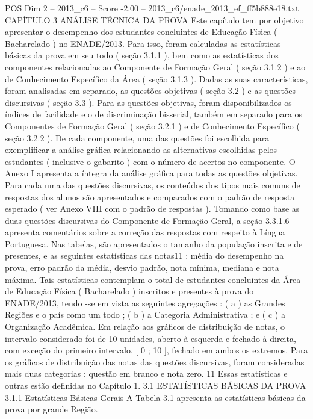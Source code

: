 \begin{textsample}{POS Dim 2 – 2013\_c6 – Score -2.00 – 2013\_c6/enade\_2013\_ef\_ff5b888e18.txt}  \label{ex:f2_pos_380}
CAPÍTULO 3 ANÁLISE TÉCNICA DA PROVA Este capítulo tem por objetivo apresentar o desempenho dos estudantes concluintes de Educação Física ( Bacharelado ) no ENADE/2013.
Para isso, foram calculadas as estatísticas básicas da prova em seu todo ( seção 3.1.1 ), bem como as estatísticas dos componentes relacionadas ao Componente de Formação Geral ( seção 3.1.2 ) e ao de Conhecimento Específico da Área ( seção 3.1.3 ).
Dadas as suas características, foram analisadas em separado, as questões objetivas ( seção 3.2 ) e as questões discursivas ( seção 3.3 ).
Para as questões objetivas, foram disponibilizados os índices de facilidade e o de discriminação bisserial, também em separado para os Componentes de Formação Geral ( seção 3.2.1 ) e de Conhecimento Específico ( seção 3.2.2 ).
De cada componente, uma das questões foi escolhida para exemplificar a análise gráfica relacionando as alternativas escolhidas pelos estudantes ( inclusive o gabarito ) com o número de acertos no componente.
O Anexo I apresenta a íntegra da análise gráfica para todas as questões objetivas.
Para cada uma das questões discursivas, os conteúdos dos tipos mais comuns de respostas dos alunos são apresentados e comparados com o padrão de resposta esperado ( ver Anexo VIII com o padrão de respostas ).
Tomando como base as duas questões discursivas do Componente de Formação Geral, a seção 3.3.1.6 apresenta comentários sobre a correção das respostas com respeito à Língua Portuguesa.
Nas tabelas, são apresentados o tamanho da população inscrita e de presentes, e as seguintes estatísticas das notas11 : média do desempenho na prova, erro padrão da média, desvio padrão, nota mínima, mediana e nota máxima.
Tais estatísticas contemplam o total de estudantes concluintes da Área de Educação Física ( Bacharelado ) inscritos e presentes à prova do ENADE/2013, tendo -se em vista as seguintes agregações : ( a ) as Grandes Regiões e o país como um todo ; ( b ) a Categoria Administrativa ; e ( c ) a Organização Acadêmica.
Em relação aos gráficos de distribuição de notas, o intervalo considerado foi de 10 unidades, aberto à esquerda e fechado à direita, com exceção do primeiro intervalo, [ 0 ; 10 ], fechado em ambos os extremos.
Para os gráficos de distribuição das notas das questões discursivas, foram consideradas mais duas categorias : questão em branco e nota zero. 11 Essas estatísticas e outras estão definidas no Capítulo 1. 3.1 ESTATÍSTICAS BÁSICAS DA PROVA 3.1.1 Estatísticas Básicas Gerais A Tabela 3.1 apresenta as estatísticas básicas da prova por grande Região.

\end{textsample}
